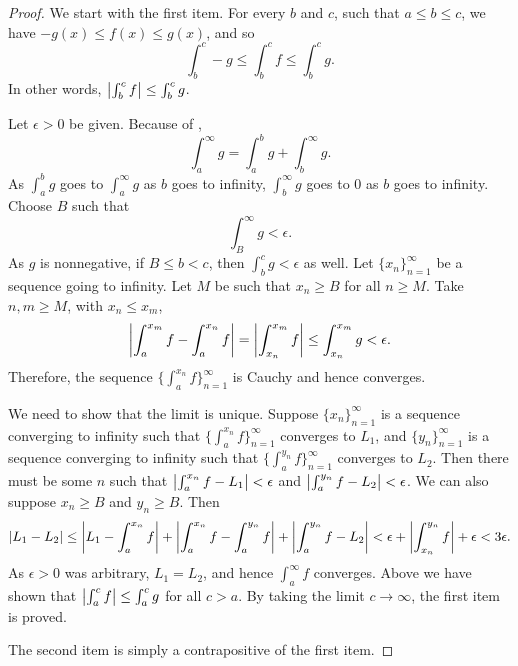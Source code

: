 \begin{proof}
We start with the first item.
For every $b$ and $c$, such that $a \leq b \leq c$, we have 
$-g(x) \leq f(x) \leq g(x)$, and so
\begin{equation*}
\int_b^c -g \leq \int_b^c f \leq \int_b^c g  .
\end{equation*}
In other words, $\left\lvert {\int_b^c f} \right\rvert \leq \int_b^c g$.

Let $\epsilon > 0$ be given.  Because
of ,
\begin{equation*}
\int_a^\infty g =
\int_a^b g +
\int_b^\infty g .
\end{equation*}
As $\int_a^b g$ goes to
$\int_a^\infty g$ as $b$ goes to infinity,
$\int_b^\infty g$ goes to 0 as $b$ goes to infinity.  Choose $B$
such that
\begin{equation*}
\int_B^\infty g < \epsilon .
\end{equation*}
As $g$ is nonnegative, if $B \leq b < c$, then
$\int_b^c g < \epsilon$ as well.
Let $\{ x_n \}_{n=1}^\infty$ be a sequence going to infinity.  Let $M$ be such that
$x_n \geq B$ for all $n \geq M$.  Take $n, m \geq M$,
with $x_n \leq x_m$,
\begin{equation*}
\left\lvert {\int_a^{x_m} f - \int_a^{x_n} f} \right\rvert 
=
\left\lvert {\int_{x_n}^{x_m} f} \right\rvert 
\leq \int_{x_n}^{x_m} g < \epsilon .
\end{equation*}
Therefore, the sequence $\bigl\{ \int_a^{x_n} f \bigr\}_{n=1}^\infty$ is Cauchy and hence converges.

We need to show that the limit is unique.  Suppose $\{ x_n \}_{n=1}^\infty$ is a sequence
converging to infinity such that
$\bigl\{ \int_a^{x_n} f \bigr\}_{n=1}^\infty$ converges to $L_1$, and $\{
y_n \}_{n=1}^\infty$ is a sequence
converging to infinity such that
$\bigl\{ \int_a^{y_n} f \bigr\}_{n=1}^\infty$ converges to $L_2$.  Then there must be some $n$ such
that
$\bigl\lvert {\int_a^{x_n} f - L_1} \bigr\rvert < \epsilon$ and 
$\bigl\lvert {\int_a^{y_n} f - L_2} \bigr\rvert < \epsilon$.  We can also suppose $x_n \geq B$
and $y_n \geq B$.  Then
\begin{equation*}
\left\lvert {L_1 - L_2} \right\rvert \leq
\left\lvert {L_1 - \int_a^{x_n} f} \right\rvert
+
\left\lvert {\int_a^{x_n} f- \int_a^{y_n} f} \right\rvert
+
\left\lvert {\int_a^{y_n} f - L_2} \right\rvert
<
\epsilon
+
\left\lvert {\int_{x_n}^{y_n} f} \right\rvert
+
\epsilon
<
3 \epsilon.
\end{equation*}
As $\epsilon > 0$ was arbitrary, $L_1 = L_2$, and hence
$\int_a^\infty f$ converges.
Above we have shown that $\left\lvert {\int_a^c f} \right\rvert \leq \int_a^c g$ for all $c > a$.
By taking the limit $c \to \infty$, the first item is proved.

The second item is simply a contrapositive of the first item.
\end{proof}

